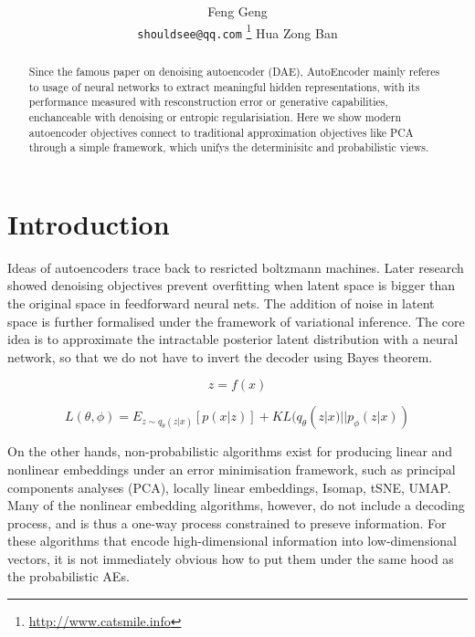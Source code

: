 \documentclass{article}
\title{
\mytitle
}
\author{ 
 \hspace{1mm} Feng Geng \\
 \texttt{shouldsee@qq.com} 
 \thanks{
	\href{http://www.catsmile.info}{http://www.catsmile.info}
     }
	\And
	Hua Zong Ban
}
\begin{document}
\maketitle

\begin{abstract}
	Since the famous paper on denoising autoencoder (DAE), 
	AutoEncoder mainly referes to usage
	of neural networks to extract meaningful hidden 
	representations, with its performance measured with 
	resconstruction error or generative capabilities,
	enchanceable with denoising or entropic
    regularisiation. Here we show modern autoencoder 
	objectives connect to traditional approximation
	objectives like PCA through a simple framework,
	which unifys the determinisitc and probabilistic views.
\end{abstract}



\section{Introduction}
	Ideas of autoencoders trace back to resricted boltzmann machines. 
	Later research showed denoising objectives prevent overfitting when 
	latent space is bigger than the original space in 
	feedforward neural nets. The addition of noise in latent 
	space is further formalised under the framework of variational
	inference. The core idea is to approximate the intractable
	posterior latent distribution with a neural network, 
	so that we do not have to invert the decoder using Bayes theorem.

	
	\begin{equation} \label{eq1}
	z = f(x)  
    \end{equation}
  	
    \begin{equation} \label{eq2}
	L(\theta,\phi) = E_{z\sim q_{\theta}(z|x)}[p(x|z)] +  KL( q_{\theta}(z|x) || p_\phi(z|x) )
	\end{equation}
	
	On the other hands, non-probabilistic algorithms 
	exist for producing linear and nonlinear embeddings
	under an error minimisation framework,
	such as principal components analyses (PCA), locally linear 
	embeddings, Isomap, tSNE, UMAP. Many of the nonlinear
	embedding algorithms, however, do not include a decoding process,
	and is thus a one-way process constrained to preseve information.
	For these algorithms that encode high-dimensional information 
    into low-dimensional vectors, it is not immediately obvious 
    how to put them under the same hood as the probabilistic AEs.
    
\end{document}
